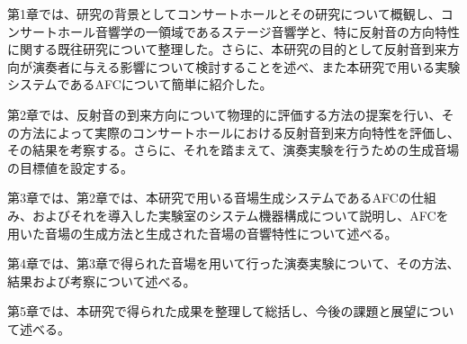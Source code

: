 \documentclass[11pt,a4j]{jreport}
\begin{document}
第1章では、研究の背景としてコンサートホールとその研究について概観し、コンサートホール音響学の一領域であるステージ音響学と、特に反射音の方向特性に関する既往研究について整理した。さらに、本研究の目的として反射音到来方向が演奏者に与える影響について検討することを述べ、また本研究で用いる実験システムであるAFCについて簡単に紹介した。

第2章では、反射音の到来方向について物理的に評価する方法の提案を行い、その方法によって実際のコンサートホールにおける反射音到来方向特性を評価し、その結果を考察する。さらに、それを踏まえて、演奏実験を行うための生成音場の目標値を設定する。

第3章では、第2章では、本研究で用いる音場生成システムであるAFCの仕組み、およびそれを導入した実験室のシステム機器構成について説明し、AFCを用いた音場の生成方法と生成された音場の音響特性について述べる。

第4章では、第3章で得られた音場を用いて行った演奏実験について、その方法、結果および考察について述べる。

第5章では、本研究で得られた成果を整理して総括し、今後の課題と展望について述べる。

\cleardoublepage


\end{document}
